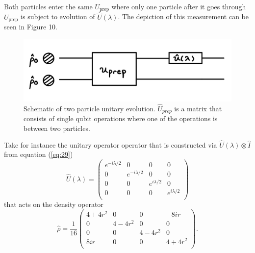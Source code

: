 \documentclass[twocolumn]{article}
\begin{document}
Both particles enter the same $U_{\text{prep}}$ where only one particle after it goes through $U_{\text{prep}}$ is subject to evolution of $\hat{U}(\lambda)$. The depiction of this measurement can be seen in Figure 10.
\begin{figure}[h]
\begin{center}
\includegraphics[width=0.90\linewidth]{Two-Particle-One-Unitary-QFI.jpg}
\caption{Schematic of two particle unitary evolution. $\hat{U}_{prep}$ is a matrix that consists of single qubit operations where one of the operations is between two particles.}
\end{center}
\end{figure}
\newline
Take for instance the unitary operator operator that is constructed via $\hat{U}(\lambda)\otimes\hat{I}$ from equation (\ref{eq:29})
\begin{equation} \label{eq:80}
\hat{U}(\lambda)=
\left(\begin{array}{cccc}
e^{-i\lambda/2} & 0 & 0 & 0 \\
0 & e^{-i\lambda/2} & 0 & 0 \\
0 & 0 & e^{i\lambda/2} & 0 \\
0 & 0 & 0 & e^{i\lambda/2} \\
\end{array}\right)
\end{equation}
that acts on the density operator
\begin{equation} \label{eq:81}
\hat{\rho}=\frac{1}{16}
\left(\begin{array}{cccc}
4+4r^2 & 0 & 0 & -8ir \\
0 & 4-4r^2 & 0 & 0 \\
0 & 0 & 4-4r^2 & 0 \\
8ir & 0 & 0 & 4+4r^2 \\
\end{array}\right).
\end{equation}
\end{document}
